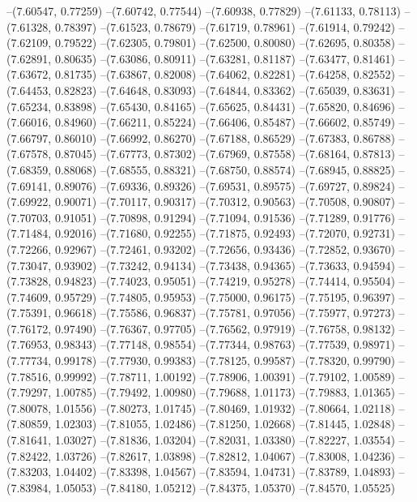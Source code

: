 --(7.60547, 0.77259)
--(7.60742, 0.77544)
--(7.60938, 0.77829)
--(7.61133, 0.78113)
--(7.61328, 0.78397)
--(7.61523, 0.78679)
--(7.61719, 0.78961)
--(7.61914, 0.79242)
--(7.62109, 0.79522)
--(7.62305, 0.79801)
--(7.62500, 0.80080)
--(7.62695, 0.80358)
--(7.62891, 0.80635)
--(7.63086, 0.80911)
--(7.63281, 0.81187)
--(7.63477, 0.81461)
--(7.63672, 0.81735)
--(7.63867, 0.82008)
--(7.64062, 0.82281)
--(7.64258, 0.82552)
--(7.64453, 0.82823)
--(7.64648, 0.83093)
--(7.64844, 0.83362)
--(7.65039, 0.83631)
--(7.65234, 0.83898)
--(7.65430, 0.84165)
--(7.65625, 0.84431)
--(7.65820, 0.84696)
--(7.66016, 0.84960)
--(7.66211, 0.85224)
--(7.66406, 0.85487)
--(7.66602, 0.85749)
--(7.66797, 0.86010)
--(7.66992, 0.86270)
--(7.67188, 0.86529)
--(7.67383, 0.86788)
--(7.67578, 0.87045)
--(7.67773, 0.87302)
--(7.67969, 0.87558)
--(7.68164, 0.87813)
--(7.68359, 0.88068)
--(7.68555, 0.88321)
--(7.68750, 0.88574)
--(7.68945, 0.88825)
--(7.69141, 0.89076)
--(7.69336, 0.89326)
--(7.69531, 0.89575)
--(7.69727, 0.89824)
--(7.69922, 0.90071)
--(7.70117, 0.90317)
--(7.70312, 0.90563)
--(7.70508, 0.90807)
--(7.70703, 0.91051)
--(7.70898, 0.91294)
--(7.71094, 0.91536)
--(7.71289, 0.91776)
--(7.71484, 0.92016)
--(7.71680, 0.92255)
--(7.71875, 0.92493)
--(7.72070, 0.92731)
--(7.72266, 0.92967)
--(7.72461, 0.93202)
--(7.72656, 0.93436)
--(7.72852, 0.93670)
--(7.73047, 0.93902)
--(7.73242, 0.94134)
--(7.73438, 0.94365)
--(7.73633, 0.94594)
--(7.73828, 0.94823)
--(7.74023, 0.95051)
--(7.74219, 0.95278)
--(7.74414, 0.95504)
--(7.74609, 0.95729)
--(7.74805, 0.95953)
--(7.75000, 0.96175)
--(7.75195, 0.96397)
--(7.75391, 0.96618)
--(7.75586, 0.96837)
--(7.75781, 0.97056)
--(7.75977, 0.97273)
--(7.76172, 0.97490)
--(7.76367, 0.97705)
--(7.76562, 0.97919)
--(7.76758, 0.98132)
--(7.76953, 0.98343)
--(7.77148, 0.98554)
--(7.77344, 0.98763)
--(7.77539, 0.98971)
--(7.77734, 0.99178)
--(7.77930, 0.99383)
--(7.78125, 0.99587)
--(7.78320, 0.99790)
--(7.78516, 0.99992)
--(7.78711, 1.00192)
--(7.78906, 1.00391)
--(7.79102, 1.00589)
--(7.79297, 1.00785)
--(7.79492, 1.00980)
--(7.79688, 1.01173)
--(7.79883, 1.01365)
--(7.80078, 1.01556)
--(7.80273, 1.01745)
--(7.80469, 1.01932)
--(7.80664, 1.02118)
--(7.80859, 1.02303)
--(7.81055, 1.02486)
--(7.81250, 1.02668)
--(7.81445, 1.02848)
--(7.81641, 1.03027)
--(7.81836, 1.03204)
--(7.82031, 1.03380)
--(7.82227, 1.03554)
--(7.82422, 1.03726)
--(7.82617, 1.03898)
--(7.82812, 1.04067)
--(7.83008, 1.04236)
--(7.83203, 1.04402)
--(7.83398, 1.04567)
--(7.83594, 1.04731)
--(7.83789, 1.04893)
--(7.83984, 1.05053)
--(7.84180, 1.05212)
--(7.84375, 1.05370)
--(7.84570, 1.05525)
